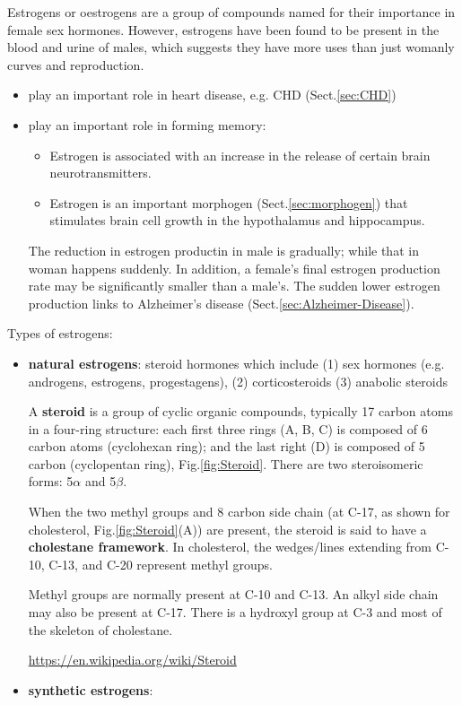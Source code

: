 Estrogens or oestrogens are a group of compounds named for their importance in
female sex hormones. However, estrogens have been found to be present in the
blood and urine of males, which suggests they have more uses  than just womanly
curves and reproduction. 
\begin{itemize}
  \item play an important role in heart disease, e.g. CHD
  (Sect.\ref{sec:CHD})
  
  \item play an important role in forming memory:
  \begin{itemize}
    \item  Estrogen is associated with an increase in the release of certain brain
  neurotransmitters. 
  
    \item Estrogen is an important morphogen (Sect.\ref{sec:morphogen}) that
    stimulates brain cell growth in the hypothalamus and hippocampus.
    
    
  \end{itemize}
  
  
  The reduction in estrogen productin in male is gradually; while that in woman
  happens suddenly. In addition,  a female's final estrogen production rate may
  be significantly smaller than a male's.
  The sudden lower estrogen production links to Alzheimer's disease
  (Sect.\ref{sec:Alzheimer-Disease}).
  
\end{itemize}


Types of estrogens:
\begin{itemize}
  \item {\bf natural estrogens}: steroid hormones which include
  (1) sex hormones (e.g. androgens, estrogens, progestagens), 
  (2) corticosteroids
  (3) anabolic steroids
  
  
\begin{mdframed}
A {\bf steroid} is a group of cyclic organic compounds, typically 17 carbon
atoms in a four-ring structure: each first three rings (A, B, C) is composed
of 6 carbon atoms (cyclohexan ring); and the last right (D) is composed of 5
carbon (cyclopentan ring), Fig.\ref{fig:Steroid}.
There are two steroisomeric forms: 5$\alpha$ and 5$\beta$.

When the two methyl groups and 8 carbon side chain (at C-17, as shown for
cholesterol, Fig.\ref{fig:Steroid}(A)) are present, the steroid is said to have
a {\bf cholestane framework}. In cholesterol,  the wedges/lines extending from
C-10, C-13, and C-20 represent methyl groups.

Methyl groups are normally present at C-10 and C-13. An alkyl side chain may
also be present at C-17.  There is a hydroxyl group at C-3 and most of the
skeleton of cholestane.

\url{https://en.wikipedia.org/wiki/Steroid}
\end{mdframed}
  
  \item {\bf synthetic estrogens}: 
\end{itemize}

